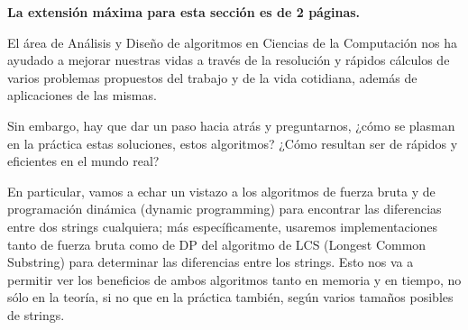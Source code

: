 \begin{mdframed}
    \textbf{La extensión máxima para esta sección es de 2 páginas.}
\end{mdframed}

El área de Análisis y Diseño de algoritmos en Ciencias de la Computación nos ha ayudado a mejorar nuestras vidas a través de la resolución y rápidos cálculos de varios problemas propuestos del trabajo y de la vida cotidiana, además de aplicaciones de las mismas.

Sin embargo, hay que dar un paso hacia atrás y preguntarnos, ¿cómo se plasman en la práctica estas soluciones, estos algoritmos? ¿Cómo resultan ser de rápidos y eficientes en el mundo real?

En particular, vamos a echar un vistazo a los algoritmos de fuerza bruta y de programación dinámica (dynamic programming) para encontrar las diferencias entre dos strings cualquiera; más específicamente, usaremos implementaciones tanto de fuerza bruta como de DP del algoritmo de LCS (Longest Common Substring) para determinar las diferencias entre los strings. Esto nos va a permitir ver los beneficios de ambos algoritmos tanto en memoria y en tiempo, no sólo en la teoría, si no que en la práctica también, según varios tamaños posibles de strings.